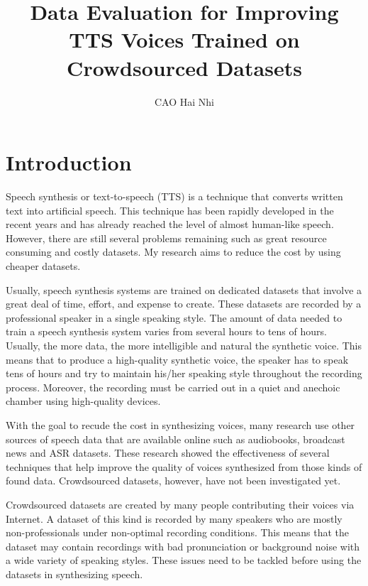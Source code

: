 \documentclass[12pt]{article}
\title{Data Evaluation for Improving TTS Voices Trained on Crowdsourced Datasets}
\author{CAO Hai Nhi}
\begin{document}
\titlepage
\cmemberspage
\firstabstract
%
%
\toc
\newpage
\listoffigures

\listoftables
%
%
\newpage


\section{Introduction}
Speech synthesis or text-to-speech (TTS) is a technique that converts written text into artificial speech. This technique has been rapidly developed in the recent years and has already reached the level of almost human-like speech. However, there are still several problems remaining such as great resource consuming and costly datasets. My research aims to reduce the cost by using cheaper datasets.

Usually, speech synthesis systems are trained on dedicated datasets that involve a great deal of time, effort, and expense to create. These datasets are recorded by a professional speaker in a single speaking style. The amount of data needed to train a speech synthesis system varies from several hours to tens of hours. Usually, the more data, the more intelligible and natural the synthetic voice. This means that to produce a high-quality synthetic voice, the speaker has to speak tens of hours and try to maintain his/her speaking style throughout the recording process. Moreover, the recording must be carried out in a quiet and anechoic chamber using high-quality devices.

With the goal to recude the cost in synthesizing voices, many research use other sources of speech data that are available online such as audiobooks, broadcast news and ASR datasets. These research showed the effectiveness of several techniques that help improve the quality of voices synthesized from those kinds of found data. Crowdsourced datasets, however, have not been investigated yet.

Crowdsourced datasets are created by many people contributing their voices via Internet. A dataset of this kind is recorded by many speakers who are mostly non-professionals under non-optimal recording conditions. This means that the dataset may contain recordings with bad pronunciation or background noise with a wide variety of speaking styles. These issues need to be tackled before using the datasets in synthesizing speech.
\end{document}
